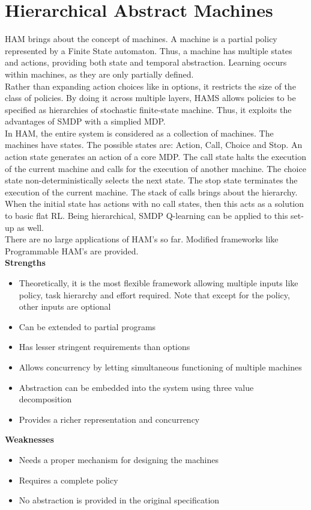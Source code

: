 \section{Hierarchical Abstract Machines}

HAM brings about the concept of machines. A machine is a partial policy represented by a Finite State automaton. Thus, a machine has multiple states and actions, providing both state and temporal abstraction. Learning occurs within machines, as they are only partially defined. \\

Rather than expanding action choices like in options, it restricts the size of the class of policies. By doing it across multiple layers, HAMS allows policies to be specified as  hierarchies of stochastic finite-state machine. Thus, it exploits the advantages of SMDP with a simplied MDP. \\

In HAM, the entire system is considered as a collection of machines. The machines have states. The possible states are: Action, Call, Choice and Stop. An action state generates an action of a core MDP. The call state halts the execution of the current machine and calls for the execution of another machine. The choice state non-deterministically selects the next state. The stop state terminates the execution of the current machine. The stack of calls brings about the hierarchy. When the initial state has actions with no call states, then this acts as a solution to basic flat RL. Being hierarchical, SMDP Q-learning can be applied to this set-up as well. \\

There are no large applications of HAM's so far. Modified frameworks like Programmable HAM's are provided. \\


\textbf{Strengths}
\begin{itemize}
    \item Theoretically, it is the most flexible framework allowing multiple inputs like policy, task hierarchy and effort required. Note that except for the policy, other inputs are optional
    \item Can be extended to partial programs 
    \item Has lesser stringent requirements than options
    \item Allows concurrency by letting simultaneous functioning of multiple machines
    \item Abstraction can be embedded into the system using three value decomposition
    \item Provides a richer representation and concurrency
\end{itemize}

\textbf{Weaknesses}
\begin{itemize}
    \item Needs a proper mechanism for designing the machines 
    \item Requires a complete policy
    \item No abstraction is provided in the original specification 
\end{itemize}

